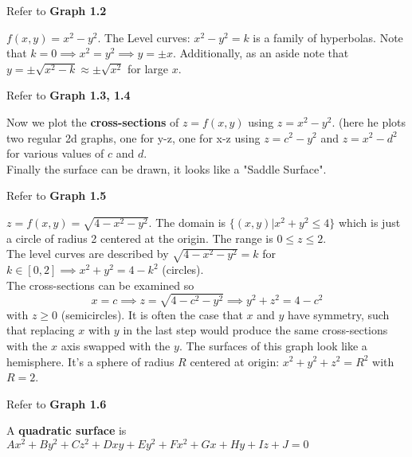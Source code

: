 \documentclass[english, 11pt]{article}
\begin{document}
   \begin{center}
    Refer to \textbf{Graph 1.2}
   \end{center}

  \begin{exmp}
    $f(x,y) = x^2 - y^2$. The Level curves: $x^2 - y^2 = k$ is a family of hyperbolas. Note that $k = 0 \implies x^2 = y^2 \implies y = \pm x$. Additionally, as an aside note that $y = \pm \sqrt{x^2 - k} \approx \pm \sqrt{x^2}$ for large $x$.

     \begin{center}
     Refer to \textbf{Graph 1.3, 1.4}
     \end{center}

    Now we plot the \textbf{cross-sections} of $z = f(x,y)$ using $z = x^2 - y^2$. (here he plots two regular 2d graphs, one for y-z, one for x-z using $z = c^2 - y^2$ and $z = x^2 - d^2$ for various values of $c$ and $d$. \\ Finally the surface can be drawn, it looks like a "Saddle Surface".

     \begin{center}
    Refer to \textbf{Graph 1.5}
  \end{center}
  \end{exmp}



\begin{exmp}
  $z = f(x,y) = \sqrt{4-x^2-y^2}$. The domain is $\{ (x,y) | x^2 + y^2 \leq 4 \}$ which is just a circle of radius 2 centered at the origin. The range is $0 \leq z \leq 2$. \\
  The level curves are described by $\sqrt{4-x^2-y^2} = k$ for $k \in [0,2] \implies x^2 + y^2 = 4-k^2$ (circles). \\
  The cross-sections can be examined so
  \[ x = c \implies z = \sqrt{4-c^2-y^2} \implies y^2 + z^2 = 4-c^2 \]
  with $z \geq 0$ (semicircles). It is often the case that $x$ and $y$ have symmetry, such that replacing $x$ with $y$ in the last step would produce the same cross-sections with the $x$ axis swapped with the $y$. The surfaces of this graph look like a hemisphere. It's a sphere of radius $R$ centered at origin: $x^2 + y^2 + z^2 = R^2$ with $R = 2$.

 \begin{center}
    Refer to \textbf{Graph 1.6}
  \end{center}

\end{exmp}

\begin{defn}
  A \textbf{quadratic surface} is $Ax^2 + By^2 + Cz^2 + Dxy + Ey^2 + Fx^2 + Gx +Hy + Iz +J = 0$
\end{defn}
\end{document}
